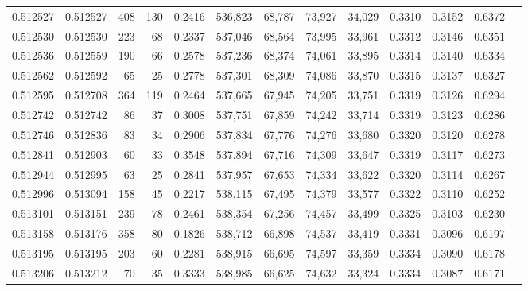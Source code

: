 \begin{tabular}{rrrrrrrrrrrrr}
0.512527 & 0.512527 &   408 &   130 &                                     0.2416 & 536,823 &  68,787 &  73,927 &  34,029 & 0.3310 & 0.3152 & 0.6372 \\
0.512530 & 0.512530 &   223 &    68 &                                     0.2337 & 537,046 &  68,564 &  73,995 &  33,961 & 0.3312 & 0.3146 & 0.6351 \\
0.512536 & 0.512559 &   190 &    66 &                                     0.2578 & 537,236 &  68,374 &  74,061 &  33,895 & 0.3314 & 0.3140 & 0.6334 \\
0.512562 & 0.512592 &    65 &    25 &                                     0.2778 & 537,301 &  68,309 &  74,086 &  33,870 & 0.3315 & 0.3137 & 0.6327 \\
0.512595 & 0.512708 &   364 &   119 &                                     0.2464 & 537,665 &  67,945 &  74,205 &  33,751 & 0.3319 & 0.3126 & 0.6294 \\
0.512742 & 0.512742 &    86 &    37 &                                     0.3008 & 537,751 &  67,859 &  74,242 &  33,714 & 0.3319 & 0.3123 & 0.6286 \\
0.512746 & 0.512836 &    83 &    34 &                                     0.2906 & 537,834 &  67,776 &  74,276 &  33,680 & 0.3320 & 0.3120 & 0.6278 \\
0.512841 & 0.512903 &    60 &    33 &                                     0.3548 & 537,894 &  67,716 &  74,309 &  33,647 & 0.3319 & 0.3117 & 0.6273 \\
0.512944 & 0.512995 &    63 &    25 &                                     0.2841 & 537,957 &  67,653 &  74,334 &  33,622 & 0.3320 & 0.3114 & 0.6267 \\
0.512996 & 0.513094 &   158 &    45 &                                     0.2217 & 538,115 &  67,495 &  74,379 &  33,577 & 0.3322 & 0.3110 & 0.6252 \\
0.513101 & 0.513151 &   239 &    78 &                                     0.2461 & 538,354 &  67,256 &  74,457 &  33,499 & 0.3325 & 0.3103 & 0.6230 \\
0.513158 & 0.513176 &   358 &    80 &                                     0.1826 & 538,712 &  66,898 &  74,537 &  33,419 & 0.3331 & 0.3096 & 0.6197 \\
0.513195 & 0.513195 &   203 &    60 &                                     0.2281 & 538,915 &  66,695 &  74,597 &  33,359 & 0.3334 & 0.3090 & 0.6178 \\
0.513206 & 0.513212 &    70 &    35 &                                     0.3333 & 538,985 &  66,625 &  74,632 &  33,324 & 0.3334 & 0.3087 & 0.6171 \\

\end{tabular}
